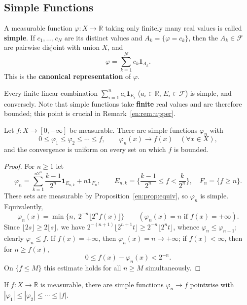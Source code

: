 \documentclass[11pt]{article}
\makeatletter
\newcommand{\envlabel}[1]{\protected@edef\@currentlabel{\themathenv}\label{#1}}
\makeatother
\begin{document}
\subsection{Simple Functions}

\begin{definition}
A measurable function $\varphi:X\to\mathbb{R}$ taking only finitely many real values is called \textbf{simple}. If $c_{1},\ldots,c_{N}$ are its distinct values and $A_{k}=\{\varphi=c_{k}\}$, then the $A_{k}\in\mathcal{F}$ are pairwise disjoint with union $X$, and
\[
\varphi=\sum_{k=1}^{N}c_{k}\mathbf{1}_{A_{k}}.
\]
This is the \textbf{canonical representation} of $\varphi$.
\end{definition}

Every finite linear combination $\sum_{i=1}^{n}a_{i}\mathbf{1}_{E_{i}}$ ($a_{i}\in\mathbb{R}$, $E_{i}\in\mathcal{F}$) is simple, and conversely. Note that simple functions take \textbf{finite} real values and are therefore bounded; this point is crucial in Remark~\ref{en:rem:upper}.

\begin{theorem}\envlabel{en:thm:simple}
Let $f:X\to[0,+\infty]$ be measurable. There are simple functions $\varphi_{n}$ with
\[
0\leq\varphi_{1}\leq\varphi_{2}\leq\cdots\leq f,\qquad \varphi_{n}(x)\to f(x)\quad(\forall x\in X),
\]
and the convergence is uniform on every set on which $f$ is bounded.
\end{theorem}

\begin{proof}
For $n\geq1$ let
\[
\varphi_{n}=\sum_{k=1}^{n2^{n}}\frac{k-1}{2^{n}}\mathbf{1}_{E_{n,k}}+n\mathbf{1}_{F_{n}},\qquad
E_{n,k}=\Big\{\frac{k-1}{2^{n}}\leq f<\frac{k}{2^{n}}\Big\},\quad F_{n}=\{f\geq n\}.
\]
These sets are measurable by Proposition~\ref{en:prop:equiv}, so $\varphi_{n}$ is simple. Equivalently,
\[
\varphi_{n}(x)=\min\big\{n,\;2^{-n}\lfloor2^{n}f(x)\rfloor\big\}\qquad(\varphi_{n}(x)=n\text{ if }f(x)=+\infty).
\]
Since $\lfloor2s\rfloor\geq2\lfloor s\rfloor$, we have $2^{-(n+1)}\lfloor2^{n+1}t\rfloor\geq2^{-n}\lfloor2^{n}t\rfloor$, whence $\varphi_{n}\leq\varphi_{n+1}$; clearly $\varphi_{n}\leq f$. If $f(x)=+\infty$, then $\varphi_{n}(x)=n\to+\infty$; if $f(x)<\infty$, then for $n\geq f(x)$,
\[
0\leq f(x)-\varphi_{n}(x)<2^{-n}.
\]
On $\{f\leq M\}$ this estimate holds for all $n\geq M$ simultaneously.
\end{proof}

\begin{corollary}\envlabel{en:cor:simple}
If $f:X\to\overline{\mathbb{R}}$ is measurable, there are simple functions $\varphi_{n}\to f$ pointwise with $|\varphi_{1}|\leq|\varphi_{2}|\leq\cdots\leq|f|$.
\end{corollary}
\end{document}
